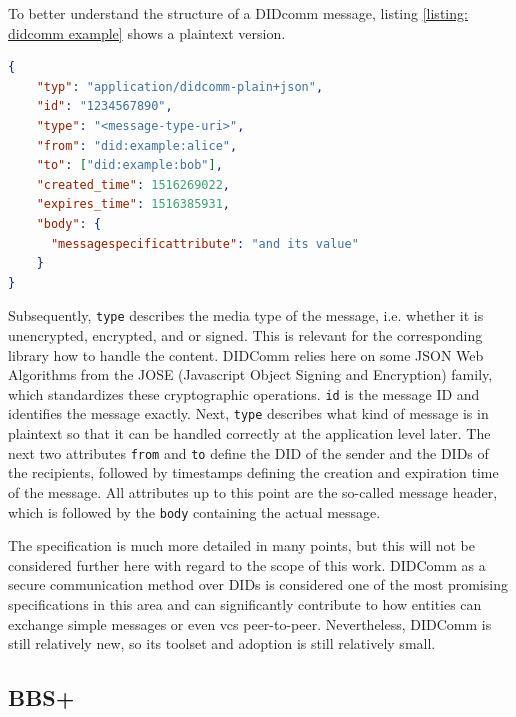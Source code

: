 		To better understand the structure of a DIDcomm message, listing \ref{listing: didcomm example} shows a plaintext version.
		\newline
		
		        \begin{lstlisting}[language=json, caption={Plaintext DIDComm message extracted from \cite{hardman_didcomm_2021}}, captionpos=b, label={listing: didcomm example}]  
{
    "typ": "application/didcomm-plain+json",
    "id": "1234567890",
    "type": "<message-type-uri>",
    "from": "did:example:alice",
    "to": ["did:example:bob"],
    "created_time": 1516269022,
    "expires_time": 1516385931,
    "body": {
      "messagespecificattribute": "and its value"
    }
}\end{lstlisting}

        Subsequently, \texttt{type} describes the media type of the message, i.e. whether it is unencrypted, encrypted, and or signed. This is relevant for the corresponding library how to handle the content. DIDComm relies here on some JSON Web Algorithms from the JOSE (Javascript Object Signing and Encryption) family, which standardizes these cryptographic operations. \texttt{id} is the message ID and identifies the message exactly. Next, \texttt{type} describes what kind of message is in plaintext so that it can be handled correctly at the application level later. The next two attributes \texttt{from} and \texttt{to} define the \ac{DID} of the sender and the \acp{DID} of the recipients, followed by timestamps defining the creation and expiration time of the message. All attributes up to this point are the so-called message header, which is followed by the \texttt{body} containing the actual message. \cite{hardman_didcomm_2021}
        
        The specification is much more detailed in many points, but this will not be considered further here with regard to the scope of this work. DIDComm as a secure communication method over \acp{DID} is considered one of the most promising specifications in this area \cite[p. 97]{preukschat_self-sovereign_2021} and can significantly contribute to how entities can exchange simple messages or even \acp{vc} peer-to-peer. Nevertheless, DIDComm is still relatively new, so its toolset and adoption is still relatively small.
		
		\subsection{BBS+}\label{subsection: bbs}
		
